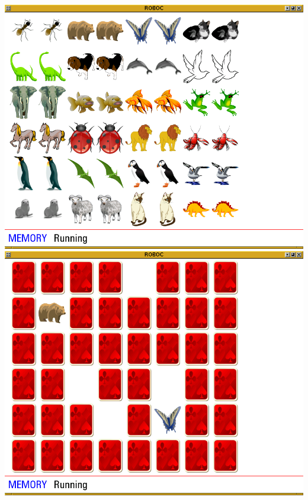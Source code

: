 \documentclass[12pt,a4paper,twoside]{article}
\renewcommand{\_}{\texttt{\symbol{95}}}
\begin{document}
\begin{center}
\includegraphics[scale=0.32,angle=0]{screenshots/artpixel/memory/animal_grid}
\includegraphics[scale=0.32,angle=0]{screenshots/artpixel/memory/playing}\\
\end{center}
\end{document}
